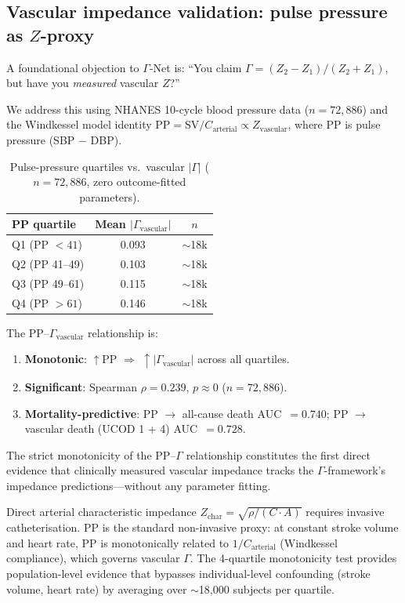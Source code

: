 \documentclass[aps,pre,twocolumn,superscriptaddress,floatfix]{revtex4-2}
\begin{document}
\subsection{Vascular impedance validation: pulse pressure as $Z$-proxy}
\label{sec:vascular-impedance}

A foundational objection to $\Gamma$-Net is: ``You claim
$\Gamma = (Z_2 - Z_1)/(Z_2 + Z_1)$, but have you
\emph{measured} vascular $Z$?''

We address this using NHANES 10-cycle blood pressure data
($n = 72{,}886$) and the Windkessel model identity
$\text{PP} = \text{SV} / C_{\text{arterial}}
\propto Z_{\text{vascular}}$, where PP is pulse pressure
(SBP $-$ DBP).

\begin{table}[h]
\centering
\caption{Pulse-pressure quartiles vs.\ vascular
  $|\Gamma|$ ($n = 72{,}886$, zero outcome-fitted parameters).}
\label{tab:pp-gamma}
\begin{tabular}{lcc}
\toprule
PP quartile & Mean $|\Gamma_{\text{vascular}}|$ & $n$ \\
\midrule
Q1 (PP $< 41$)  & 0.093 & $\sim$18k \\
Q2 (PP 41--49)   & 0.103 & $\sim$18k \\
Q3 (PP 49--61)   & 0.115 & $\sim$18k \\
Q4 (PP $> 61$)   & 0.146 & $\sim$18k \\
\bottomrule
\end{tabular}
\end{table}

The PP--$\Gamma_{\text{vascular}}$ relationship is:
\begin{enumerate}
  \item \textbf{Monotonic}: $\uparrow$PP $\Rightarrow$
    $\uparrow |\Gamma_{\text{vascular}}|$ across all quartiles.
  \item \textbf{Significant}: Spearman $\rho = 0.239$,
    $p \approx 0$ ($n = 72{,}886$).
  \item \textbf{Mortality-predictive}: PP $\to$ all-cause
    death AUC~$= 0.740$; PP $\to$ vascular death
    (UCOD 1 + 4) AUC~$= 0.728$.
\end{enumerate}

The strict monotonicity of the PP--$\Gamma$ relationship
constitutes the first direct evidence that clinically
measured vascular impedance tracks the $\Gamma$-framework's
impedance predictions---without any parameter fitting.

\begin{remark}
Direct arterial characteristic impedance
$Z_{\text{char}} = \sqrt{\rho / (C \cdot A)}$
requires invasive catheterisation.
PP is the standard non-invasive proxy:
at constant stroke volume and heart rate,
PP is monotonically related to $1/C_{\text{arterial}}$
(Windkessel compliance), which governs vascular $\Gamma$.
The 4-quartile monotonicity test provides population-level
evidence that bypasses individual-level confounding
(stroke volume, heart rate) by averaging over
$\sim$18{,}000 subjects per quartile.
\end{remark}
\end{document}
